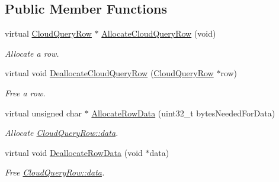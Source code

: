 \subsection*{Public Member Functions}
\begin{DoxyCompactItemize}
\item 
\hypertarget{class_rak_net_1_1_cloud_allocator_aecbcb598de1cb9bf73ed79db6369dc72}{virtual \hyperlink{struct_rak_net_1_1_cloud_query_row}{Cloud\-Query\-Row} $\ast$ \hyperlink{class_rak_net_1_1_cloud_allocator_aecbcb598de1cb9bf73ed79db6369dc72}{Allocate\-Cloud\-Query\-Row} (void)}\label{class_rak_net_1_1_cloud_allocator_aecbcb598de1cb9bf73ed79db6369dc72}

\begin{DoxyCompactList}\small\item\em Allocate a row. \end{DoxyCompactList}\item 
\hypertarget{class_rak_net_1_1_cloud_allocator_a7b8a329c1adb402b2884b4b9ae4e758e}{virtual void \hyperlink{class_rak_net_1_1_cloud_allocator_a7b8a329c1adb402b2884b4b9ae4e758e}{Deallocate\-Cloud\-Query\-Row} (\hyperlink{struct_rak_net_1_1_cloud_query_row}{Cloud\-Query\-Row} $\ast$row)}\label{class_rak_net_1_1_cloud_allocator_a7b8a329c1adb402b2884b4b9ae4e758e}

\begin{DoxyCompactList}\small\item\em Free a row. \end{DoxyCompactList}\item 
\hypertarget{class_rak_net_1_1_cloud_allocator_a38b590fedf4d7402e80e805d414b9312}{virtual unsigned char $\ast$ \hyperlink{class_rak_net_1_1_cloud_allocator_a38b590fedf4d7402e80e805d414b9312}{Allocate\-Row\-Data} (uint32\-\_\-t bytes\-Needed\-For\-Data)}\label{class_rak_net_1_1_cloud_allocator_a38b590fedf4d7402e80e805d414b9312}

\begin{DoxyCompactList}\small\item\em Allocate \hyperlink{struct_rak_net_1_1_cloud_query_row_adfb3a5f46eae6f8649618757dbc77022}{Cloud\-Query\-Row\-::data}. \end{DoxyCompactList}\item 
\hypertarget{class_rak_net_1_1_cloud_allocator_a36c3de0f8ba2bc8577b553e4206d2e4f}{virtual void \hyperlink{class_rak_net_1_1_cloud_allocator_a36c3de0f8ba2bc8577b553e4206d2e4f}{Deallocate\-Row\-Data} (void $\ast$data)}\label{class_rak_net_1_1_cloud_allocator_a36c3de0f8ba2bc8577b553e4206d2e4f}

\begin{DoxyCompactList}\small\item\em Free \hyperlink{struct_rak_net_1_1_cloud_query_row_adfb3a5f46eae6f8649618757dbc77022}{Cloud\-Query\-Row\-::data}. \end{DoxyCompactList}\end{DoxyCompactItemize}


